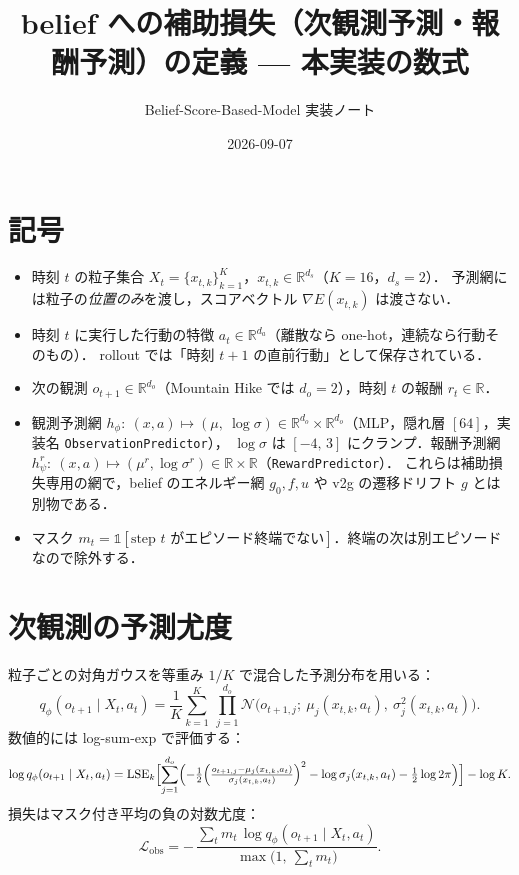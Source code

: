 \documentclass[a4paper,11pt]{article}
\title{belief への補助損失（次観測予測・報酬予測）の定義 --- 本実装の数式}
\author{Belief-Score-Based-Model 実装ノート}
\date{2026-09-07}
\begin{document}
\maketitle

\section{記号}

\begin{itemize}
  \item 時刻 $t$ の粒子集合 $X_t=\{x_{t,k}\}_{k=1}^{K}$，$x_{t,k}\in\mathbb{R}^{d_s}$（$K=16$，$d_s=2$）．
        予測網には粒子の\emph{位置のみ}を渡し，スコアベクトル $\nabla E(x_{t,k})$ は渡さない．
  \item 時刻 $t$ に実行した行動の特徴 $a_t\in\mathbb{R}^{d_a}$（離散なら one-hot，連続なら行動そのもの）．
        rollout では「時刻 $t+1$ の直前行動」として保存されている．
  \item 次の観測 $o_{t+1}\in\mathbb{R}^{d_o}$（Mountain Hike では $d_o=2$），時刻 $t$ の報酬 $r_t\in\mathbb{R}$．
  \item 観測予測網 $h_\phi:\ (x,a)\mapsto(\mu,\ \log\sigma)\in\mathbb{R}^{d_o}\times\mathbb{R}^{d_o}$（MLP，隠れ層 $[64]$，実装名 \texttt{ObservationPredictor}），
        $\log\sigma$ は $[-4,\,3]$ にクランプ．報酬予測網 $h^{r}_\psi:\ (x,a)\mapsto(\mu^r,\log\sigma^r)\in\mathbb{R}\times\mathbb{R}$（\texttt{RewardPredictor}）．
        これらは補助損失専用の網で，belief のエネルギー網 $g_0,f,u$ や v2g の遷移ドリフト $g$ とは別物である．
  \item マスク $m_t=\mathbb{1}[\text{step } t \text{ がエピソード終端でない}]$．終端の次は別エピソードなので除外する．
\end{itemize}

\section{次観測の予測尤度}

粒子ごとの対角ガウスを等重み $1/K$ で混合した予測分布を用いる：
\begin{equation}
  q_\phi(o_{t+1}\mid X_t,a_t)
  = \frac{1}{K}\sum_{k=1}^{K}\ \prod_{j=1}^{d_o}
    \mathcal{N}\!\bigl(o_{t+1,j};\ \mu_j(x_{t,k},a_t),\ \sigma_j^2(x_{t,k},a_t)\bigr).
  \label{eq:qobs}
\end{equation}
数値的には log-sum-exp で評価する：
\begin{equation}
  \log q_\phi(o_{t+1}\mid X_t,a_t)
  = \operatorname{LSE}_{k}\Bigl[\sum_{j=1}^{d_o}\Bigl(
      -\tfrac12\Bigl(\tfrac{o_{t+1,j}-\mu_j(x_{t,k},a_t)}{\sigma_j(x_{t,k},a_t)}\Bigr)^{2}
      -\log\sigma_j(x_{t,k},a_t)-\tfrac12\log 2\pi\Bigr)\Bigr]-\log K .
  \label{eq:logqobs}
\end{equation}
損失はマスク付き平均の負の対数尤度：
\begin{equation}
  \mathcal{L}_{\mathrm{obs}}
  = -\,\frac{\sum_{t} m_t\,\log q_\phi(o_{t+1}\mid X_t,a_t)}{\max\!\bigl(1,\ \sum_t m_t\bigr)} .
  \label{eq:lobs}
\end{equation}
\end{document}
